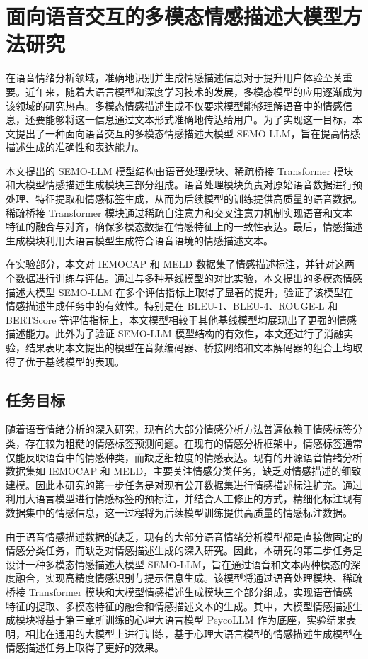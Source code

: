 
\chapter{面向语音交互的多模态情感描述大模型方法研究}

在语音情绪分析领域，准确地识别并生成情感描述信息对于提升用户体验至关重要。近年来，随着大语言模型和深度学习技术的发展，多模态模型的应用逐渐成为该领域的研究热点。多模态情感描述生成不仅要求模型能够理解语音中的情感信息，还要能够将这一信息通过文本形式准确地传达给用户。为了实现这一目标，本文提出了一种面向语音交互的多模态情感描述大模型 SEMO-LLM，旨在提高情感描述生成的准确性和表达能力。

本文提出的 SEMO-LLM 模型结构由语音处理模块、稀疏桥接 Transformer 模块和大模型情感描述生成模块三部分组成。语音处理模块负责对原始语音数据进行预处理、特征提取和情感标签生成，从而为后续模型的训练提供高质量的语音数据。稀疏桥接 Transformer 模块通过稀疏自注意力和交叉注意力机制实现语音和文本特征的融合与对齐，确保多模态数据在情感特征上的一致性表达。最后，情感描述生成模块利用大语言模型生成符合语音语境的情感描述文本。

在实验部分，本文对 IEMOCAP 和 MELD 数据集了情感描述标注，并针对这两个数据进行训练与评估。通过与多种基线模型的对比实验，本文提出的多模态情感描述大模型 SEMO-LLM 在多个评估指标上取得了显著的提升，验证了该模型在情感描述生成任务中的有效性。特别是在 BLEU-1、BLEU-4、ROUGE-L 和 BERTScore 等评估指标上，本文模型相较于其他基线模型均展现出了更强的情感描述能力。此外为了验证 SEMO-LLM 模型结构的有效性，本文还进行了消融实验，结果表明本文提出的模型在音频编码器、桥接网络和文本解码器的组合上均取得了优于基线模型的表现。

\section{任务目标}

随着语音情绪分析的深入研究，现有的大部分情感分析方法普遍依赖于情感标签分类，存在较为粗糙的情感标签预测问题。在现有的情感分析框架中，情感标签通常仅能反映语音中的情感种类，而缺乏细粒度的情感表达。现有的开源语音情绪分析数据集如 IEMOCAP 和 MELD，主要关注情感分类任务，缺乏对情感描述的细致建模。因此本研究的第一步任务是对现有公开数据集进行情感描述标注扩充。通过利用大语言模型进行情感标签的预标注，并结合人工修正的方式，精细化标注现有数据集中的情感信息，这一过程将为后续模型训练提供高质量的情感标注数据。

由于语音情感描述数据的缺乏，现有的大部分语音情绪分析模型都是直接做固定的情感分类任务，而缺乏对情感描述生成的深入研究。因此，本研究的第二步任务是设计一种多模态情感描述大模型 SEMO-LLM，旨在通过语音和文本两种模态的深度融合，实现高精度情感识别与提示信息生成。该模型将通过语音处理模块、稀疏桥接 Transformer 模块和大模型情感描述生成模块三个部分组成，实现语音情感特征的提取、多模态特征的融合和情感描述文本的生成。其中，大模型情感描述生成模块将基于第三章所训练的心理大语言模型 PsycoLLM 作为底座，实验结果表明，相比在通用的大模型上进行训练，基于心理大语言模型的情感描述生成模型在情感描述任务上取得了更好的效果。

